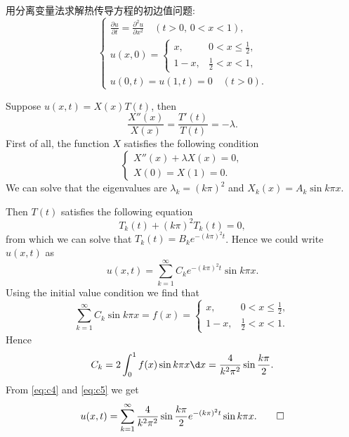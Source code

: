 \begin{exercise}
  用分离变量法求解热传导方程的初边值问题:
  \[\begin{cases}
    \frac{\partial u}{\partial t} = \frac{\partial^2 u}{\partial x^2} \quad (t>0,\, 0<x<1), \\
    u(x,0) = \begin{cases}
               x,     & 0 < x \leq\frac12, \\
               1 - x, & \frac12 < x < 1,
             \end{cases} \\
    u(0,t) = u(1,t) = 0 \quad (t>0).
  \end{cases}\]
\end{exercise}

\begin{solution}
  Suppose $u(x,t) = X(x)T(t)$, then
  \[ \frac{X''(x)}{X(x)} = \frac{T'(t)}{T(t)} = -\lambda. \]
  First of all, the function $X$ satisfies the following condition
  \begin{equation}\label{eq:c3}
    \begin{cases}
      X''(x) + \lambda X(x) = 0, \\
      X(0) = X(1) = 0.
    \end{cases}
  \end{equation}
  We can solve that the eigenvalues are $\lambda_k = (k\pi)^2$ and $X_k(x) = A_k\sin k\pi x$.

  Then $T(t)$ satisfies the following equation
  \[ T_k(t) + (k\pi)^2T_k(t) = 0, \]
  from which we can solve that $T_k(t) = B_k e^{-(k\pi)^2t}$. Hence
  we could write $u(x,t)$ as
  \begin{equation}\label{eq:c4}
    u(x,t) = \sum_{k=1}^\infty C_k e^{-(k\pi)^2t} \sin k\pi x.
  \end{equation}
  Using the initial value condition we find that
  \[ \sum_{k=1}^\infty C_k \sin k\pi x = f(x) = \begin{cases}
    x,     & 0 < x \leq\frac12, \\
    1 - x, & \frac12 < x < 1.
  \end{cases} \]
  Hence
  \begin{equation}\label{eq:c5}
    C_k = 2 \int_0^1 f(x) \sin k\pi x \d x = \frac{4}{k^2\pi^2} \sin\frac{k\pi}{2}.
  \end{equation}
  From \eqref{eq:c4} and \eqref{eq:c5} we get
  \[ u(x,t) = \sum_{k=1}^\infty \frac{4}{k^2\pi^2} \sin\frac{k\pi}{2}
  e^{-(k\pi)^2t} \sin k\pi x. \qedhere \]
\end{solution}

